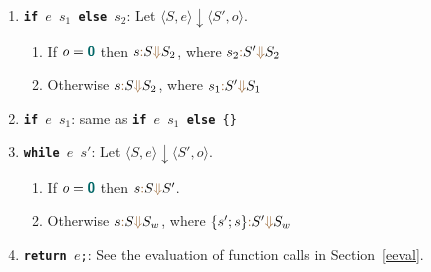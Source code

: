\documentclass{article}
\newcommand{\tuple}[1]{\ensuremath{\langle #1 \rangle}}
\newcommand{\vterminal}[1]{\textsf{\textcolor{dgreen}{\texttt{#1}}}}
\newcommand{\Ckw}[1]{{\textsf{\textbf{#1}}}}
\newcommand{\Vint}[1]{{\textsf{\textcolor{dcyan}{\textbf{#1}}}}}
\newcommand{\SEVAL}[3]{#1\textcolor{dorange}{:} #2\textcolor{dorange}{\Downarrow}#3}
\begin{document}
\begin{enumerate}
\begin{enumerate}
\begin{itemize}
      \end{itemize}
    \item \vterminal{\Ckw{if} $e$ $s_1$ \Ckw{else} $s_2$}: Let $\tuple{S, e} \downarrow \tuple{S', o}$.
      \begin{enumerate}
        \item If $o = \Vint{0}$ then $\SEVAL{s}{S}{S_2}$, where $\SEVAL{s_2}{S'}{S_2}$
        \item Otherwise $\SEVAL{s}{S}{S_2}$, where $\SEVAL{s_1}{S'}{S_1}$
      \end{enumerate}
    \item \vterminal{\Ckw{if} $e$ $s_1$}: same as \vterminal{\Ckw{if} $e$ $s_1$ \Ckw{else} \{\}}
    \item \vterminal{\Ckw{while} $e$ $s'$}: Let $\tuple{S, e} \downarrow \tuple{S', o}$.
      \begin{enumerate}
        \item If $o = \Vint{0}$ then $\SEVAL{s}{S}{S'}$.
        \item Otherwise $\SEVAL{s}{S}{S_w}$, where $\SEVAL{\{ s'; s \}}{S'}{S_w}$
      \end{enumerate}
    \item \vterminal{\Ckw{return} $e$;}: See the evaluation of function calls in Section~\ref{eeval}.
  \end{enumerate}
\end{enumerate}





\end{document}
